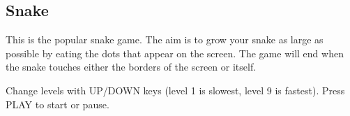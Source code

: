 \subsection{Snake}
This is the popular snake game. The aim is to grow your snake as large
as possible by eating the dots that appear on the screen. The game will
end when the snake touches either the borders of the screen or itself.

Change levels with UP/DOWN keys (level 1 is slowest, level 9 is
fastest). Press PLAY to start or pause. 

